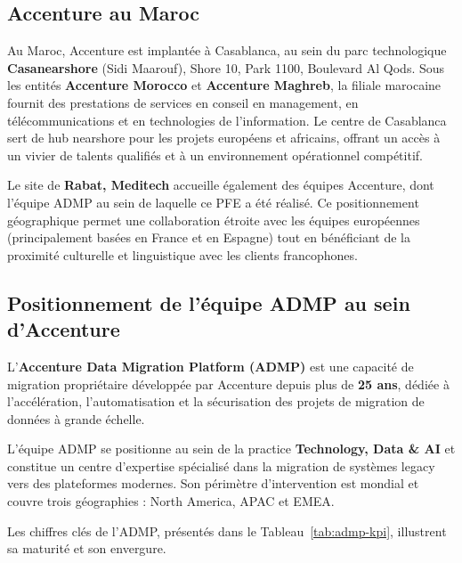 \subsection{Accenture au Maroc}
\label{subsec:accenture-maroc}

Au Maroc, Accenture est implantée à Casablanca, au sein du parc technologique \textbf{Casanearshore} (Sidi Maarouf), Shore 10, Park 1100, Boulevard Al Qods. Sous les entités \textbf{Accenture Morocco} et \textbf{Accenture Maghreb}, la filiale marocaine fournit des prestations de services en conseil en management, en télécommunications et en technologies de l'information. Le centre de Casablanca sert de hub nearshore pour les projets européens et africains, offrant un accès à un vivier de talents qualifiés et à un environnement opérationnel compétitif.

Le site de \textbf{Rabat, Meditech} accueille également des équipes Accenture, dont l'équipe ADMP au sein de laquelle ce PFE a été réalisé. Ce positionnement géographique permet une collaboration étroite avec les équipes européennes (principalement basées en France et en Espagne) tout en bénéficiant de la proximité culturelle et linguistique avec les clients francophones.

\subsection{Positionnement de l'équipe ADMP au sein d'Accenture}
\label{subsec:admp-positionnement}

L'\textbf{Accenture Data Migration Platform (ADMP)} est une capacité de migration propriétaire développée par Accenture depuis plus de \textbf{25 ans}, dédiée à l'accélération, l'automatisation et la sécurisation des projets de migration de données à grande échelle.

L'équipe ADMP se positionne au sein de la practice \textbf{Technology, Data \& AI} et constitue un centre d'expertise spécialisé dans la migration de systèmes legacy vers des plateformes modernes. Son périmètre d'intervention est mondial et couvre trois géographies : North America, APAC et EMEA.

Les chiffres clés de l'ADMP, présentés dans le Tableau~\ref{tab:admp-kpi}, illustrent sa maturité et son envergure.

